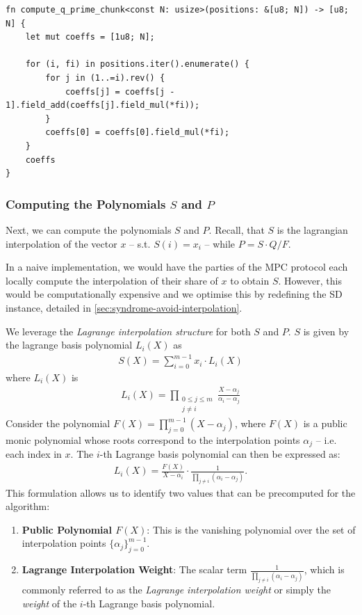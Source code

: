\documentclass[11pt]{report}
\theoremstyle{definition}
\theoremstyle{plain}
\begin{document}
\begin{verbatim}
fn compute_q_prime_chunk<const N: usize>(positions: &[u8; N]) -> [u8; N] {
    let mut coeffs = [1u8; N];

    for (i, fi) in positions.iter().enumerate() {
        for j in (1..=i).rev() {
            coeffs[j] = coeffs[j - 1].field_add(coeffs[j].field_mul(*fi));
        }
        coeffs[0] = coeffs[0].field_mul(*fi);
    }
    coeffs
}
\end{verbatim}

\subsubsection{Computing the Polynomials $S$ and $P$}

Next, we can compute the polynomials $S$ and $P$. Recall, that $S$ is the lagrangian interpolation of the vector $x$ -- s.t. $S(i) = x_i$ -- while $P = S \cdot Q / F$.

In a naive implementation, we would have the parties of the MPC protocol each locally compute the interpolation of their share of $x$ to obtain $S$. However, this would be computationally expensive and we optimise this by redefining the SD instance, detailed in \autoref{sec:syndrome-avoid-interpolation}.

We leverage the \textit{Lagrange interpolation structure} for both $S$ and $P$. $S$ is given by the lagrange basis polynomial $L_i(X)$ as
\begin{align*}
  S(X) = \sum_{i=0}^{m-1} x_i \cdot L_i(X)
\end{align*}
where $L_i(X)$ is
\begin{align*}
  L_i(X) = \prod_{\substack{0\leq j\leq m \\ j\neq i}} \frac{X-\alpha_j}{\alpha_i-\alpha_j}
\end{align*}
Consider the polynomial $F(X) = \prod_{j=0}^{m-1} (X - \alpha_j)$, where $F(X)$ is a public monic polynomial whose roots correspond to the interpolation points $\alpha_j$ -- i.e. each index in $x$. The $i$-th Lagrange basis polynomial can then be expressed as:
\begin{align*}
  L_i(X) = \frac{F(X)}{X - \alpha_i} \cdot \frac{1}{\prod_{j \neq i} (\alpha_i - \alpha_j)}.
\end{align*}
This formulation allows us to identify two values that can be precomputed for the algorithm:

\begin{enumerate}
  \item \textbf{Public Polynomial $F(X)$}: This is the vanishing polynomial over the set of interpolation points $\{\alpha_j\}_{j=0}^{m-1}$.
  \item \textbf{Lagrange Interpolation Weight}: The scalar term $\frac{1}{\prod_{j \neq i} (\alpha_i - \alpha_j)}$, which is commonly referred to as the \textit{Lagrange interpolation weight} or simply the \textit{weight} of the $i$-th Lagrange basis polynomial.
\end{enumerate}
\end{document}
